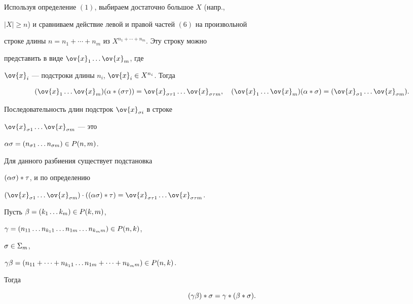 \begin{pf}


Используя определение $(1)$, выбираем достаточно большое $X$ (напр.,


$|X|\geq n$) и сравниваем действие левой и правой частей $(6)$ на произвольной


строке длины $n=n_1+\dotsb +n_m$ из $X^{n_1+\dotsb+n_m}$. Эту строку можно


представить в виде $\ov{x}_1\dotsc \ov{x}_m$, где


$\ov{x}_i$ --- подстроки длины $n_i$, $\ov{x}_i\in X^{n_i}$. Тогда


$$


(\ov{x}_1\dotsc \ov{x}_m)(\al * (\s\t))=


\ov{x}_{\s\t 1} \dotsc \ov{x}_{\s\t m},\quad


(\ov{x}_1\dotsc \ov{x}_m)(\al * \s)=(\ov{x}_{\s 1}\dotsc \ov{x}_{\s m}).


$$





Последовательность длин подстрок $\ov{x}_{\s{i}}$ в строке


$\ov{x}_{\s 1}\dotsc \ov{x}_{\s m}$ --- это


$\alpha\sigma = (n_{\sigma 1}\dotsc n_{\sigma m}) \in P(n,m)$.


Для данного разбиения существует подстановка


$(\alpha\sigma) * \tau$, и по определению


$(\ov{x}_{\s 1}\dotsc \ov{x}_{\s m})\cdot ((\al\s) * \t)




=\ov{x}_{\s\t 1} \dotsc \ov{x}_{\s\t m}$.


\end{pf}











\begin{lem}


Пусть $\beta=(k_1\dotsc k_m)\in P(k,m)$,


$\gamma=(n_{11}\dotsc n_{k_11}\dotsc n_{1m}\dotsc n_{k_m m})\in P(n,k)$,


$\sigma\in\Sigma_m$,


$\g\be=(n_{11}+\dotsb +n_{k_11}\dotsc n_{1m}+\dotsb


+n_{k_m m})\in P(n,k)$.


Тогда


\begin{equation}


(\g\be) * \s=\g * (\be * \s).


\end{equation}


\end{lem}





